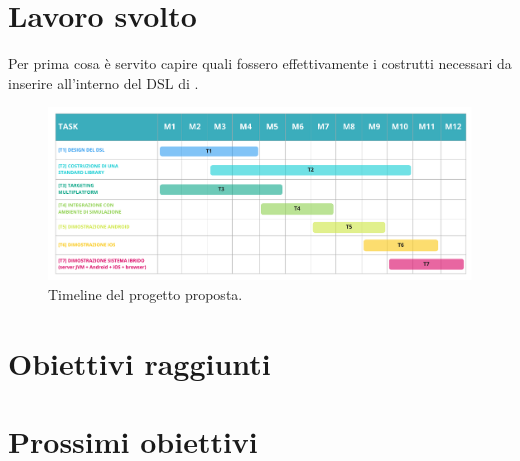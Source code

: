 \section{Lavoro svolto}\label{sec:lavoro-svolto}

Per prima cosa è servito capire quali fossero effettivamente i costrutti necessari da inserire all'interno del DSL di \ck{}.




\label{sec:contribution}
\begin{figure}
    \centering
    \includegraphics[width=\textwidth]{images/collektive_timeline}
    \caption{Timeline del progetto proposta.}
    \label{fig:timeline}
\end{figure}

\section{Obiettivi raggiunti}\label{sec:obiettivi-raggiunti}

\section{Prossimi obiettivi}\label{sec:prossimi-obiettivi}

